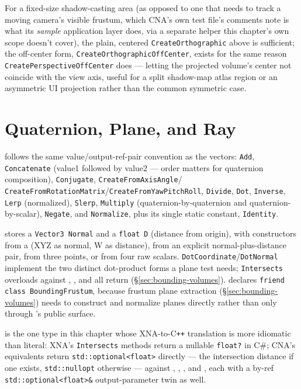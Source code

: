 For a fixed-size shadow-casting area (as opposed to one that needs to track a moving camera's
visible frustum, which CNA's own test file's comments note is what its \emph{sample}
application layer does, via a separate helper this chapter's own scope doesn't cover), the
plain, centered \texttt{CreateOrthographic} above is sufficient; the off-center form,
\texttt{CreateOrthographicOffCenter}, exists for the same reason
\texttt{CreatePerspectiveOffCenter} does --- letting the projected volume's center not
coincide with the view axis, useful for a split shadow-map atlas region or an asymmetric UI
projection rather than the common symmetric case.

\section{Quaternion, Plane, and Ray}

 follows the same value/output-ref-pair convention as the vectors:
\texttt{Add}, \texttt{Concatenate} (value1 followed by value2 --- order matters for
quaternion composition), \texttt{Conjugate}, \texttt{CreateFromAxisAngle}/%
\texttt{CreateFromRotationMatrix}/\texttt{CreateFromYawPitchRoll}, \texttt{Divide},
\texttt{Dot}, \texttt{Inverse}, \texttt{Lerp} (normalized), \texttt{Slerp},
\texttt{Multiply} (quaternion-by-quaternion and quaternion-by-scalar), \texttt{Negate}, and
\texttt{Normalize}, plus its single static constant, \texttt{Identity}.

 stores a \texttt{Vector3 Normal} and a \texttt{float D} (distance from
origin), with constructors from a  (XYZ as normal, W as distance), from an
explicit normal-plus-distance pair, from three points, or from four raw scalars.
\texttt{DotCoordinate}/\texttt{DotNormal} implement the two distinct dot-product forms a
plane test needs; \texttt{Intersects} overloads against ,
, and  all return
 (\S\ref{sec:bounding-volumes}).  declares
\texttt{friend class BoundingFrustum}, because frustum plane extraction
(\S\ref{sec:bounding-volumes}) needs to construct and normalize planes directly rather than
only through 's public surface.

 is the one type in this chapter whose XNA-to-C\texttt{++} translation is more
idiomatic than literal: XNA's \texttt{Intersects} methods return a nullable
\texttt{float?} in C\#; CNA's equivalents return \texttt{std::optional<float>} directly ---
the intersection distance if one exists, \texttt{std::nullopt} otherwise --- against
, , , and
, each with a by-ref \texttt{std::optional<float>\&} output-parameter
twin as well.

